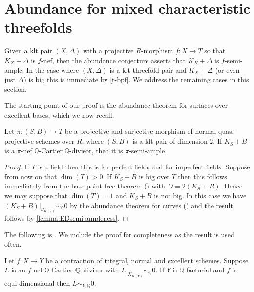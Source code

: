	
\section{Abundance for mixed characteristic threefolds}

Given a klt pair $(X,\Delta)$ with a projective $R$-morphism $f \colon X \to T$ so that $K_{X}+\Delta$ is $f$-nef, then the abundance conjecture asserts that $K_{X}+\Delta$ is $f$-semi-ample. 
In the case where $(X,\Delta)$ is a klt threefold pair and $K_{X}+\Delta$ (or even just $\Delta$) is big this is immediate by \autoref{t-bpf}. 
We address the remaining cases in this section.

The starting point of our proof is the abundance theorem for surfaces over excellent bases, which we now recall. 

\begin{theorem}\label{abundance-dim2}
	Let $\pi \colon (S,B) \to T$ be a projective and surjective morphism of normal quasi-projective schemes over $R$, 
	where  $(S,B)$ is a klt pair of dimension 2.  
	If $K_{S}+B$ is a $\pi$-nef $\mathbb{Q}$-Cartier $\mathbb{Q}$-divisor, then it is $\pi$-semi-ample.
\end{theorem}

\begin{proof}	
	If $T$ is a field then this is \cite[Theorem 1.2]{fujino2012log} for perfect fields and \cite{tanaka2020abundance} for imperfect fields. 
	Suppose from now on that $\dim (T) > 0$.
	If $K_{S}+B$ is big over $T$ then this follows immediately from the base-point-free theorem (\cite[Theorem 4.2]{Tan18}) with $D=2(K_{S}+B)$. Hence we may suppose that $\dim (T)=1$ and $K_{S}+B$ is not big. In this case we have $(K_{S}+B)|_{S_{K(T)}} \sim_{\mathbb{Q}} 0$ by the abundance theorem for curves (\cite[Lemma 9.22]{bhatt2020}) and the result follows by \autoref{lemma:EDsemi-ampleness}.
\end{proof}

The following is \cite[Lemma 2.17]{cascini2020relative}. We include the proof for completeness as the result is used often.


\begin{lemma}\label{lemma:EDsemi-ampleness}
	Let $f\colon X \to Y$ be a contraction of integral, normal and excellent schemes. Suppose $L$ is an $f$-nef $\mathbb{Q}$-Cartier $\mathbb{Q}$-divisor with $L|_{X_{K(Y)}} \sim_{\mathbb{Q}} 0$. If $Y$ is $\mathbb{Q}$-factorial and $f$ is equi-dimensional then $L \sim_{Y,\mathbb{Q}} 0$.
\end{lemma}

